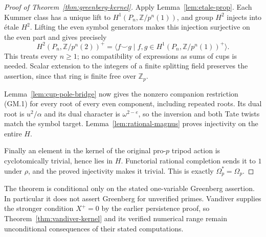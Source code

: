\begin{proof}[Proof of Theorem~\ref{thm:greenberg-kernel}]
Apply Lemma~\ref{lem:etale-prop}. Each Kummer class has a unique
lift to $H^1(P_n,\mathbb Z/p^n(1))$, and group $H^2$ injects into
\'etale $H^2$. Lifting the even symbol generators makes this
injection surjective on the even part and gives precisely
\[
 H^2(P_n,\mathbb Z/p^n(2))^+
  =\bigl\langle f\smile g\mid
       f,g\in H^1(P_n,\mathbb Z/p^n(1))^+\bigr\rangle.       \tag{GM.10}
\]
This treats every $n\ge1$; no compatibility of expressions as sums
of cups is needed. Scalar extension to the integers of a finite
splitting field preserves the assertion, since that ring is finite
free over $\mathbb Z_p$.

Lemma~\ref{lem:cup-pole-bridge} now gives the nonzero companion
restriction (GM.1) for every root of every even component, including
repeated roots. Its dual root is $u^2/\alpha$ and its dual character
is $\omega^{2-e}$, so the inversion and both Tate twists match
the symbol target. Lemma~\ref{lem:rational-magnus} proves
injectivity on the entire $H$.

Finally an element in the kernel of the original pro-$p$ tripod
action is cyclotomically trivial, hence lies in $H$. Functorial
rational completion sends it to $1$ under $\rho$, and the proved
injectivity makes it trivial. This is exactly
$\Omega_p^*=\Omega_p$.
\end{proof}

The theorem is conditional only on the stated one-variable
Greenberg assertion. In particular it does not assert Greenberg
for unverified primes. Vandiver supplies the stronger condition
$X^+=0$ by the earlier persistence proof, so
Theorem~\ref{thm:vandiver-kernel} and its verified numerical range
remain unconditional consequences of their stated computations.
